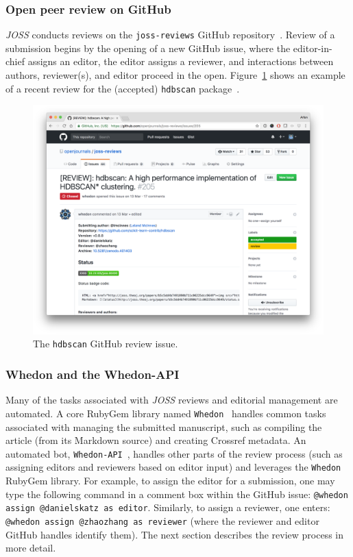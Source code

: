 \documentclass{article}
\newcommand\joss{\textit{JOSS}}
\begin{document}
\subsubsection*{Open peer review on GitHub}

\joss{} conducts reviews on the \texttt{joss-reviews} GitHub repository~\cite{joss-reviews}.  Review of a submission begins by the opening of a new GitHub issue, where the editor-in-chief assigns an editor, the editor assigns a reviewer, and interactions between authors, reviewer(s), and editor proceed in the open. Figure~\ref{fig:review} shows an example of a recent review for the (accepted) \texttt{hdbscan} package~\cite{McInnes2017}.


\begin{figure}[t]
\centering
\includegraphics[width=1.0\textwidth]{review.png}
\caption{The \texttt{hdbscan} GitHub review issue.
\label{fig:review}}
\end{figure}

\subsubsection*{Whedon and the Whedon-API}

Many of the tasks associated with \joss{} reviews and editorial management are automated.
A core RubyGem library named \texttt{Whedon}~\cite{whedon-gem} handles common tasks associated with managing the submitted manuscript, such as compiling the article (from its Markdown source) and creating Crossref metadata.
An automated bot, \texttt{Whedon-API}~\cite{whedon-api}, handles other parts of the review process (such as assigning editors and reviewers based on editor input) and leverages the \texttt{Whedon} RubyGem library.
For example, to assign the editor for a submission, one may type the following command in a comment box within the GitHub issue: \texttt{@whedon assign @danielskatz as editor}. Similarly, to assign a reviewer, one enters: \texttt{@whedon assign @zhaozhang as reviewer} (where the reviewer and editor GitHub handles identify them). The next section describes the review process in more detail.
\end{document}
